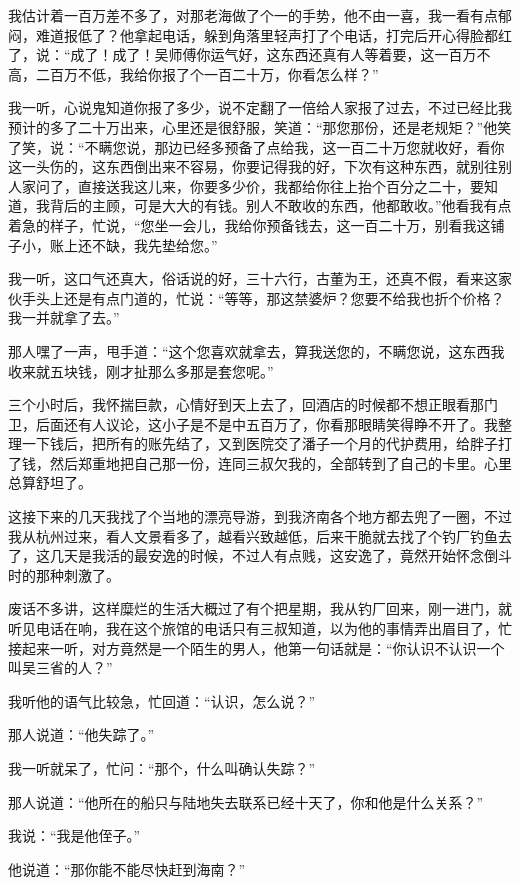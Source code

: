我估计着一百万差不多了，对那老海做了个一的手势，他不由一喜，我一看有点郁闷，难道报低了？他拿起电话，躲到角落里轻声打了个电话，打完后开心得脸都红了，说：“成了！成了！吴师傅你运气好，这东西还真有人等着要，这一百万不高，二百万不低，我给你报了个一百二十万，你看怎么样？”

我一听，心说鬼知道你报了多少，说不定翻了一倍给人家报了过去，不过已经比我预计的多了二十万出来，心里还是很舒服，笑道：“那您那份，还是老规矩？”他笑了笑，说：“不瞒您说，那边已经多预备了点给我，这一百二十万您就收好，看你这一头伤的，这东西倒出来不容易，你要记得我的好，下次有这种东西，就别往别人家问了，直接送我这儿来，你要多少价，我都给你往上抬个百分之二十，要知道，我背后的主顾，可是大大的有钱。别人不敢收的东西，他都敢收。”他看我有点着急的样子，忙说，“您坐一会儿，我给你预备钱去，这一百二十万，别看我这铺子小，账上还不缺，我先垫给您。”

我一听，这口气还真大，俗话说的好，三十六行，古董为王，还真不假，看来这家伙手头上还是有点门道的，忙说：“等等，那这禁婆炉？您要不给我也折个价格？我一并就拿了去。”

那人嘿了一声，甩手道：“这个您喜欢就拿去，算我送您的，不瞒您说，这东西我收来就五块钱，刚才扯那么多那是套您呢。”

三个小时后，我怀揣巨款，心情好到天上去了，回酒店的时候都不想正眼看那门卫，后面还有人议论，这小子是不是中五百万了，你看那眼睛笑得睁不开了。我整理一下钱后，把所有的账先结了，又到医院交了潘子一个月的代护费用，给胖子打了钱，然后郑重地把自己那一份，连同三叔欠我的，全部转到了自己的卡里。心里总算舒坦了。

这接下来的几天我找了个当地的漂亮导游，到我济南各个地方都去兜了一圈，不过我从杭州过来，看人文景看多了，越看兴致越低，后来干脆就去找了个钓厂钓鱼去了，这几天是我活的最安逸的时候，不过人有点贱，这安逸了，竟然开始怀念倒斗时的那种刺激了。

废话不多讲，这样糜烂的生活大概过了有个把星期，我从钓厂回来，刚一进门，就听见电话在响，我在这个旅馆的电话只有三叔知道，以为他的事情弄出眉目了，忙接起来一听，对方竟然是一个陌生的男人，他第一句话就是：“你认识不认识一个叫吴三省的人？”

我听他的语气比较急，忙回道：“认识，怎么说？”

那人说道：“他失踪了。”

我一听就呆了，忙问：“那个，什么叫确认失踪？”

那人说道：“他所在的船只与陆地失去联系已经十天了，你和他是什么关系？”

我说：“我是他侄子。”

他说道：“那你能不能尽快赶到海南？”

